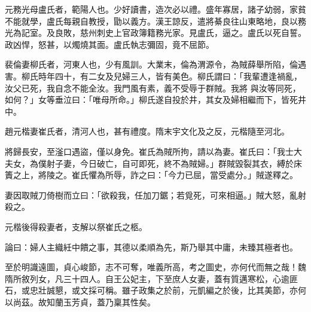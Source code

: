 \begin{pinyinscope}
 元務光母盧氏者，範陽人也。少好讀書，造次必以禮。盛年寡居，諸子幼弱，家貧不能就學，盧氏每親自教授，勖以義方。漢王諒反，遣將綦良往山東略地，良以務光為記室。及良敗，慈州刺史上官政簿籍務光家。見盧氏，逼之。盧氏以死自誓。政凶悍，怒甚，以燭燒其面。盧氏執志彌固，竟不屈節。



 裴倫妻柳氏者，河東人也，少有風訓。大業末，倫為渭源令，為賊薛舉所陷，倫遇害。柳氏時年四十，有二女及兒婦三人，皆有美色。柳氏謂曰：「我輩遭逢禍亂，汝父已死，我自念不能全汝。我門風有素，義不受辱于群賊。我將
 與汝等同死，如何？」女等垂泣曰：「唯母所命。」柳氏遂自投於井，其女及婦相繼而下，皆死井中。



 趙元楷妻崔氏者，清河人也，甚有禮度。隋末宇文化及之反，元楷隨至河北。



 將歸長安，至滏口遇盜，僅以身免。崔氏為賊所拘，請以為妻。崔氏曰：「我士大夫女，為僕射子妻，今日破亡，自可即死，終不為賊婦。」群賊毀裂其衣，縛於床簀之上，將陵之。崔氏懼為所辱，詐之曰：「今力已屈，當受處分。」賊遂釋之。



 妻因取賊刀倚樹而立曰：「欲殺我，任加刀鋸；若覓死，可來相逼。」賊大怒，亂射殺之。



 元楷後得殺妻者，支解以祭崔氏之柩。



 論曰：婦人主織紝中饋之事，其德以柔順為先，斯乃舉其中庸，未臻其極者也。



 至於明識遠圖，貞心峻節，志不可奪，唯義所高，考之圖史，亦何代而無之哉！魏隋所敘列女，凡三十四人。自王公妃主，下至庶人女妻，蓋有質邁寒松，心逾匪石，或忠壯誠懇，或文採可稱。雖子政集之於前，元凱編之於後，比其美節，亦何以尚茲。故知蘭玉芳貞，蓋乃稟其性矣。



\end{pinyinscope}